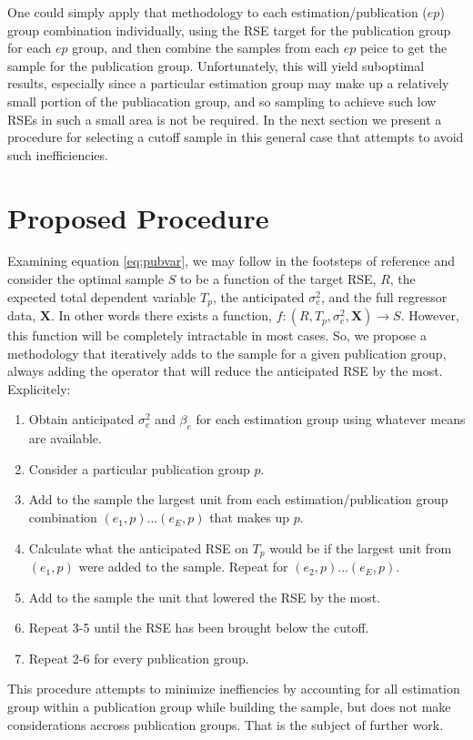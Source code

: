 \documentclass[11pt]{article} %
\begin{document}
One could simply apply that methodology to each estimation/publication ($ep$) group combination individually, using the RSE target for the publication group for each $ep$ group, and then combine the samples from each $ep$ peice to get the sample for the publication group. Unfortunately, this will yield suboptimal results, especially since a particular estimation group may make up a relatively small portion of the publiacation group, and so sampling to achieve such low RSEs in such a small area is not be required. In the next section we present a procedure for selecting a cutoff sample in this general case that attempts to avoid such inefficiencies.

\section{Proposed Procedure}
Examining equation \ref{eq:pubvar}, we may follow in the footsteps of reference \cite{Knaub2013} and consider the optimal sample $S$ to be a function of the target RSE, $R$, the expected total dependent variable $T_p$, the anticipated $\sigma_e^2$, and the full regressor data, $\mathbf{X}$. In other words there exists a function, $f: (R,T_p,\sigma_e^2,\mathbf{X}) \rightarrow S$. However, this function will be completely intractable in most cases. So, we propose a methodology that iteratively adds to the sample for a given publication group, always adding the operator that will reduce the anticipated RSE by the most. Explicitely:
\begin{enumerate}
\item
Obtain anticipated $\sigma_e^2$ and $\beta_e$ for each estimation group using whatever means are available.
\item
Consider a particular publication group $p$.
\item
Add to the sample the largest unit from each estimation/publication group combination $(e_1,p) ... (e_E,p)$ that makes up $p$.
\item
Calculate what the anticipated RSE on $T_p$ would be if the largest unit from $(e_1,p)$ were added to the sample. Repeat for $(e_2,p) ... (e_E,p)$. 
\item
Add to the sample the unit that lowered the RSE by the most.
\item
Repeat 3-5 until the RSE has been brought below the cutoff.
\item
Repeat 2-6 for every publication group.
\end{enumerate}
This procedure attempts to minimize ineffiencies by accounting for all estimation group within a publication group while building the sample, but does not make considerations accross publication groups. That is the subject of further work.
\end{document}
